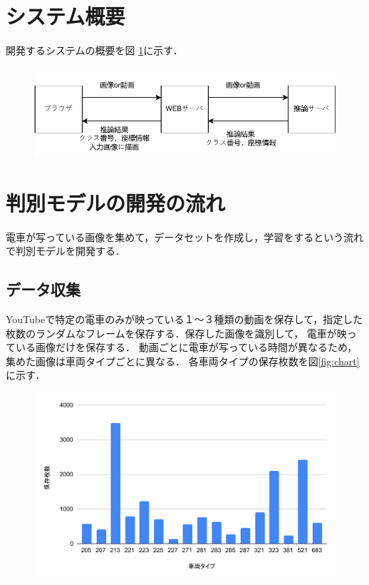\begin{multicols*}{2}
\section{システム概要}
開発するシステムの概要を図 \ref{abc}に示す．
\begin{figure} %
	\label{abc}
	\centering
	\includegraphics[width=\linewidth]{obj/system.pdf}
\end{figure}

\section{判別モデルの開発の流れ}
電車が写っている画像を集めて，データセットを作成し，学習をするという流れで判別モデルを開発する．

\subsection{データ収集}
	YouTubeで特定の電車のみが映っている１〜３種類の動画を保存して，指定した枚数のランダムなフレームを保存する．保存した画像を識別して，	電車が映っている画像だけを保存する．
	動画ごとに電車が写っている時間が異なるため，集めた画像は車両タイプごとに異なる．
	各車両タイプの保存枚数を図\ref{fig:chart}に示す．
	
	\begin{figure}
		\centering
		\includegraphics[width=\linewidth]{obj/chart.pdf}
	\end{figure}

\end{multicols*}
